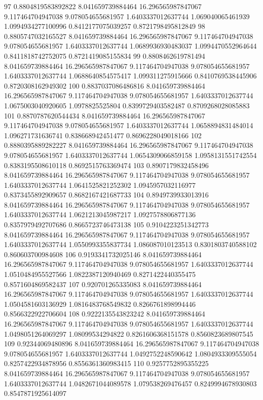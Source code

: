 {97 0.8804819583892822 8.041659739884464 16.296565987847067 9.117464704947038 9.078054655681957 1.6403337012637744 1.069040065461939 1.0994934277100996 0.8412177075039257 0.8721798495812849
98 0.8805747032165527 8.041659739884464 16.296565987847067 9.117464704947038 9.078054655681957 1.6403337012637744 1.0689936930483037 1.0994470552964644 0.8411818742752075 0.8721419085155834
99 0.8808462619781494 8.041659739884464 16.296565987847067 9.117464704947038 9.078054655681957 1.6403337012637744 1.0688640854575417 1.099311275915666 0.8410769538445906 0.8720308162949302
100 0.8837037086486816 8.041659739884464 16.296565987847067 9.117464704947038 9.078054655681957 1.6403337012637744 1.0675003040920605 1.0978825525804 0.8399729403582487 0.8709268028085883
101 0.8870787620544434 8.041659739884464 16.296565987847067 9.117464704947038 9.078054655681957 1.6403337012637744 1.0658894831484014 1.096271731636741 0.838668942451477 0.8696228049018166
102 0.8880395889282227 8.041659739884464 16.296565987847067 9.117464704947038 9.078054655681957 1.6403337012637744 1.0654309066859158 1.0958131551742554 0.8383195508610118 0.8692515763369474
103 0.8907179832458496 8.041659739884464 16.296565987847067 9.117464704947038 9.078054655681957 1.6403337012637744 1.0641525821252302 1.0945957032116977 0.8373455892909657 0.8682167421687733
104 0.8949739933013916 8.041659739884464 16.296565987847067 9.117464704947038 9.078054655681957 1.6403337012637744 1.0621213045987217 1.0927578806877136 0.8357979492707686 0.8665723746473138
105 0.9104223251342773 8.041659739884464 16.296565987847067 9.117464704947038 9.078054655681957 1.6403337012637744 1.0550993355837734 1.086087010123513 0.8301803740588102 0.860603700984608
106 0.9193341732025146 8.041659739884464 16.296565987847067 9.117464704947038 9.078054655681957 1.6403337012637744 1.0510484955527566 1.0822387120940469 0.8271422440355475 0.8571604869582437
107 0.920701265335083 8.041659739884464 16.296565987847067 9.117464704947038 9.078054655681957 1.6403337012637744 1.0504581603136929 1.0816483768549832 0.8266761898994446 0.8566322922706604
108 0.9222135543823242 8.041659739884464 16.296565987847067 9.117464704947038 9.078054655681957 1.6403337012637744 1.0498051264069297 1.08099534294822 0.8261606368151578 0.8560823689807545
109 0.92344069480896 8.041659739884464 16.296565987847067 9.117464704947038 9.078054655681957 1.6403337012637744 1.0492752248590642 1.0804933309555054 0.8257422934878956 0.8556361360983415
110 0.9257752895355225 8.041659739884464 16.296565987847067 9.117464704947038 9.078054655681957 1.6403337012637744 1.0482671044089578 1.079538269476457 0.8249994678930803 0.8547871925614097
}

